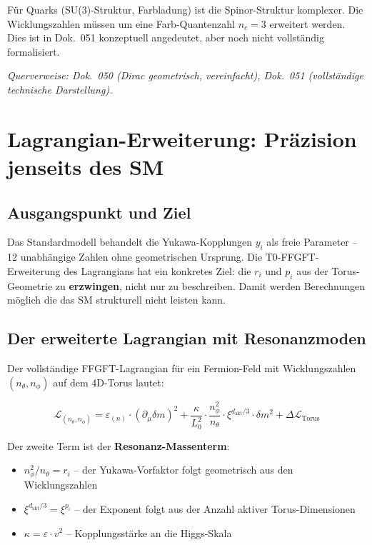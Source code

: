 Für Quarks (SU(3)-Struktur, Farbladung) ist die Spinor-Struktur
komplexer. Die Wicklungszahlen müssen um eine Farb-Quantenzahl
$n_c = 3$ erweitert werden. Dies ist in Dok.~051 konzeptuell
angedeutet, aber noch nicht vollständig formalisiert.

\noindent\textit{Querverweise: Dok.~050 (Dirac geometrisch, vereinfacht),
Dok.~051 (vollständige technische Darstellung).}

\section{Lagrangian-Erweiterung: Präzision jenseits des \texorpdfstring{SM}{SM}}

\subsection{Ausgangspunkt und Ziel}

Das Standardmodell behandelt die Yukawa-Kopplungen $y_i$ als freie
Parameter -- 12 unabhängige Zahlen ohne geometrischen Ursprung.
Die T0-FFGFT-Erweiterung des Lagrangians hat ein konkretes Ziel:
die $r_i$ und $p_i$ aus der Torus-Geometrie zu \textbf{erzwingen},
nicht nur zu beschreiben. Damit werden Berechnungen möglich die
das SM strukturell nicht leisten kann.

\subsection{Der erweiterte Lagrangian mit Resonanzmoden}

Der vollständige FFGFT-Lagrangian für ein Fermion-Feld mit
Wicklungszahlen $(n_\theta, n_\phi)$ auf dem 4D-Torus lautet:

\begin{equation}
    \mathcal{L}_{(n_\theta, n_\phi)} = \varepsilon_{(n)} \cdot
    (\partial_\mu \delta m)^2
    + \frac{\kappa}{L_0^2} \cdot \frac{n_\phi^2}{n_\theta} \cdot
    \xi^{d_{\text{akt}}/3} \cdot \delta m^2
    + \Delta\mathcal{L}_{\text{Torus}}
    \label{eq:L_extended}
\end{equation}

Der zweite Term ist der \textbf{Resonanz-Massenterm}:
\begin{itemize}
    \item $n_\phi^2/n_\theta = r_i$ -- der Yukawa-Vorfaktor folgt
          geometrisch aus den Wicklungszahlen
    \item $\xi^{d_{\text{akt}}/3} = \xi^{p_i}$ -- der Exponent
          folgt aus der Anzahl aktiver Torus-Dimensionen
    \item $\kappa = \varepsilon \cdot v^2$ -- Kopplungsstärke
          an die Higgs-Skala
\end{itemize}

